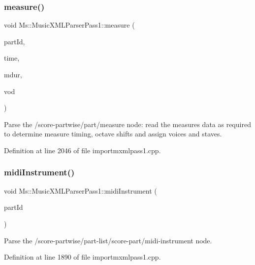 \subsubsection{\texorpdfstring{measure()}{measure()}}
{\footnotesize\ttfamily void Ms\+::\+Music\+X\+M\+L\+Parser\+Pass1\+::measure (\begin{DoxyParamCaption}\item[{const Q\+String \&}]{part\+Id,  }\item[{const \hyperlink{class_ms_1_1_fraction}{Fraction}}]{time,  }\item[{\hyperlink{class_ms_1_1_fraction}{Fraction} \&}]{mdur,  }\item[{\hyperlink{class_ms_1_1_voice_overlap_detector}{Voice\+Overlap\+Detector} \&}]{vod }\end{DoxyParamCaption})}

Parse the /score-\/partwise/part/measure node\+: read the measures data as required to determine measure timing, octave shifts and assign voices and staves. 

Definition at line 2046 of file importmxmlpass1.\+cpp.

\mbox{\label{class_ms_1_1_music_x_m_l_parser_pass1_a62c10a3dbdfa48e117da30d553edcbcb}} 
\subsubsection{\texorpdfstring{midi\+Instrument()}{midiInstrument()}}
{\footnotesize\ttfamily void Ms\+::\+Music\+X\+M\+L\+Parser\+Pass1\+::midi\+Instrument (\begin{DoxyParamCaption}\item[{const Q\+String \&}]{part\+Id }\end{DoxyParamCaption})}

Parse the /score-\/partwise/part-\/list/score-\/part/midi-\/instrument node. 

Definition at line 1890 of file importmxmlpass1.\+cpp.

\mbox{\label{class_ms_1_1_music_x_m_l_parser_pass1_ad4313551e5931ebeaf8abd78502ece9d}} 
